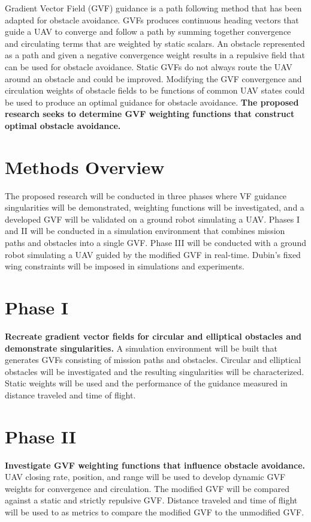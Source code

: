 \documentclass[numbered,pdftex]{ohio-etd}
\begin{document}
Gradient Vector Field (GVF) guidance is a path following method that has been adapted for obstacle avoidance. GVFs produces continuous heading vectors that guide a UAV to converge and follow a path by summing together convergence and circulating terms that are weighted by static scalars. An obstacle represented as a path and given a negative convergence weight results in a repulsive field that can be used for obstacle avoidance. Static GVFs do not always route the UAV around an obstacle and could be improved. Modifying the GVF convergence and circulation weights of obstacle fields to be functions of common UAV states could be used to produce an optimal guidance for obstacle avoidance. \textbf{The proposed research seeks to determine GVF weighting functions that construct optimal obstacle avoidance.}


 \pagebreak
 
 
\section{Methods Overview}
The proposed research will be conducted in three phases where VF guidance  singularities will be demonstrated, weighting functions will be investigated, and a developed GVF will be validated on a ground robot simulating a UAV.  Phases I and II will be conducted in a simulation environment that combines mission paths and obstacles into a single GVF. Phase III will be conducted with a ground robot simulating a UAV guided by the modified GVF in real-time. Dubin's fixed wing constraints will be imposed in simulations and experiments. 


\section{Phase I}
\textbf{Recreate gradient vector fields for circular and elliptical obstacles and demonstrate singularities.} A simulation environment will be built that generates GVFs consisting of mission paths and obstacles. Circular and elliptical obstacles will be investigated and the resulting singularities will be characterized. Static weights will be used and the performance of the guidance measured in distance traveled and time of flight. 



\section{Phase II}
\textbf{Investigate GVF weighting functions that influence obstacle avoidance.} UAV closing rate, position, and range will be used to develop dynamic GVF weights for convergence and circulation. The modified GVF will be compared against a static and strictly repulsive GVF. Distance traveled and time of flight will be used to as metrics to compare the modified GVF to the unmodified GVF.  
\end{document}
